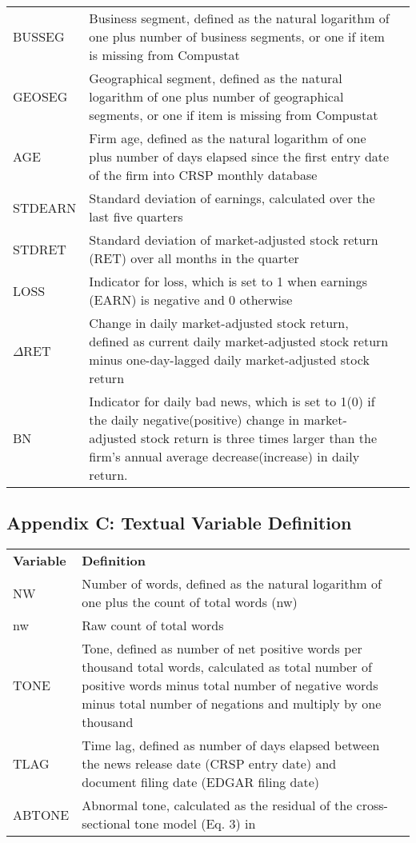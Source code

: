 \documentclass[a4paper]{article}
\begin{document}
\begin{table}[H]
\begin{tabular}{lp{15cm}p{15cm}}
		BUSSEG & Business segment, defined as the natural logarithm of one plus number of business segments, or one if item is missing from Compustat\\
		GEOSEG & Geographical segment, defined as the natural logarithm of one plus number of geographical segments, or one if item is missing from Compustat\\
		AGE & Firm age, defined as the natural logarithm of one plus number of days elapsed since the first entry date of the firm into CRSP monthly database\\
		STD\textunderscore EARN & Standard deviation of earnings, calculated over the last five quarters\\
		STD\textunderscore RET & Standard deviation of market-adjusted stock return (RET) over all months in the quarter\\
		LOSS & Indicator for loss, which is set to 1 when earnings (EARN) is negative and 0 otherwise\\
		$\Delta$RET & Change in daily market-adjusted stock return, defined as current daily market-adjusted stock return minus one-day-lagged daily market-adjusted stock return \\
		BN & Indicator for daily bad news, which is set to 1(0) if the daily negative(positive) change in market-adjusted stock return is three times larger than the firm’s annual average decrease(increase) in daily return.\\
		
	\end{tabular}%
\end{table}%

\subsection{Appendix C: Textual Variable Definition}
\begin{table}[H]
	\centering
	\begin{tabular}{lp{15cm}p{15cm}}
		\textbf{Variable} & \textbf{Definition} \\
		NW & Number of words, defined as the natural logarithm of one plus the count of total words (nw)\\
		nw & Raw count of total words\\
		TONE & Tone, defined as number of net positive words per thousand total words, calculated as total number of positive words minus total number of negative words minus total number of negations and multiply by one thousand\\
		TLAG & Time lag, defined as number of days elapsed between the news release date (CRSP entry date) and document filing date (EDGAR filing date)\\
		ABTONE & Abnormal tone, calculated as the residual of the cross-sectional tone model (Eq. 3) in \cite{huangToneManagement2014}\\
		
	\end{tabular}%
\end{table}%
\end{document}
